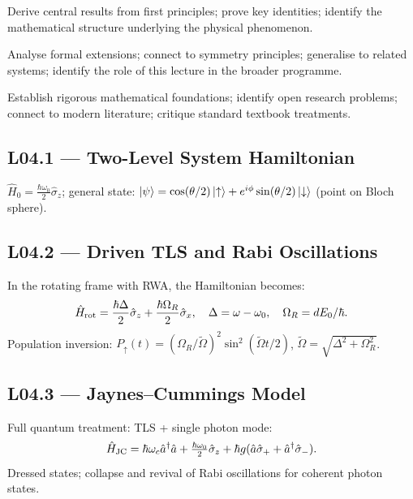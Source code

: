 \quad
Derive central results from first principles; prove key identities; identify
the mathematical structure underlying the physical phenomenon.

\quad
Analyse formal extensions; connect to symmetry principles; generalise to
related systems; identify the role of this lecture in the broader programme.

\quad
Establish rigorous mathematical foundations; identify open research problems;
connect to modern literature; critique standard textbook treatments.


\subsection*{L04.1 — Two-Level System Hamiltonian}
\begin{tcolorbox}[lecturebox, title={TLS and Bloch Sphere}]
$\hat{H}_0 = \frac{\hbar\omega_0}{2}\hat{\sigma}_z$; general state:
$\ket{\psi}=\cos(\theta/2)\ket{\uparrow}+e^{i\phi}\sin(\theta/2)\ket{\downarrow}$
(point on Bloch sphere).
\end{tcolorbox}

\subsection*{L04.2 — Driven TLS and Rabi Oscillations}
In the rotating frame with RWA, the Hamiltonian becomes:
\begin{equation}
  \hat{H}_{\rm rot} = \frac{\hbar\Delta}{2}\hat{\sigma}_z + \frac{\hbar\Omega_R}{2}\hat{\sigma}_x,
  \quad \Delta = \omega - \omega_0,\quad \Omega_R = dE_0/\hbar.
  \label{eq:L04.1}
\end{equation}
Population inversion: $P_\uparrow(t) = (\Omega_R/\tilde\Omega)^2\sin^2(\tilde\Omega t/2)$,
$\tilde\Omega = \sqrt{\Delta^2+\Omega_R^2}$.

\subsection*{L04.3 — Jaynes–Cummings Model}
Full quantum treatment: TLS + single photon mode:
\begin{equation}
  \hat{H}_{\rm JC} = \hbar\omega_c\hat{a}^\dagger\hat{a}
    + \tfrac{\hbar\omega_0}{2}\hat{\sigma}_z
    + \hbar g(\hat{a}\hat{\sigma}_+ + \hat{a}^\dagger\hat{\sigma}_-).
  \label{eq:L04.2}
\end{equation}
Dressed states; collapse and revival of Rabi oscillations for coherent photon states.


